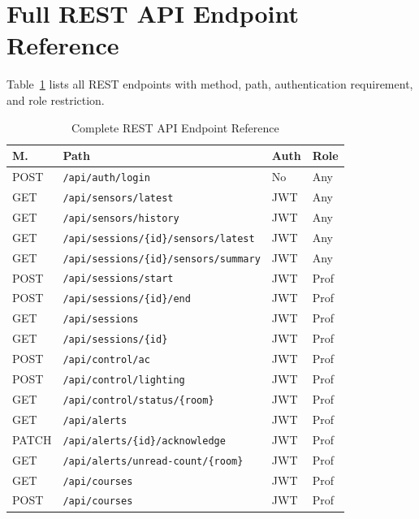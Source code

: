\section{Full REST API Endpoint Reference}
\label{app:api}

Table~\ref{tab:app_api} lists all REST endpoints with method, path,
authentication requirement, and role restriction.

\begin{table}[H]
\centering
\caption{Complete REST API Endpoint Reference}
\label{tab:app_api}
\begin{tabular}{@{}p{0.8cm}p{3.6cm}p{1.2cm}p{2.0cm}@{}}
\toprule
\textbf{M.} & \textbf{Path} & \textbf{Auth} & \textbf{Role} \\
\midrule
POST & \texttt{/api/auth/login}               & No  & Any \\
GET  & \texttt{/api/sensors/latest}           & JWT & Any \\
GET  & \texttt{/api/sensors/history}          & JWT & Any \\
GET  & \texttt{/api/sessions/\{id\}/sensors/latest} & JWT & Any \\
GET  & \texttt{/api/sessions/\{id\}/sensors/summary} & JWT & Any \\
POST & \texttt{/api/sessions/start}           & JWT & Prof \\
POST & \texttt{/api/sessions/\{id\}/end}      & JWT & Prof \\
GET  & \texttt{/api/sessions}                 & JWT & Prof \\
GET  & \texttt{/api/sessions/\{id\}}          & JWT & Prof \\
POST & \texttt{/api/control/ac}               & JWT & Prof \\
POST & \texttt{/api/control/lighting}         & JWT & Prof \\
GET  & \texttt{/api/control/status/\{room\}}  & JWT & Prof \\
GET  & \texttt{/api/alerts}                   & JWT & Prof \\
PATCH& \texttt{/api/alerts/\{id\}/acknowledge}& JWT & Prof \\
GET  & \texttt{/api/alerts/unread-count/\{room\}} & JWT & Prof \\
GET  & \texttt{/api/courses}                  & JWT & Prof \\
POST & \texttt{/api/courses}                  & JWT & Prof \\

\end{tabular}
\end{table}
